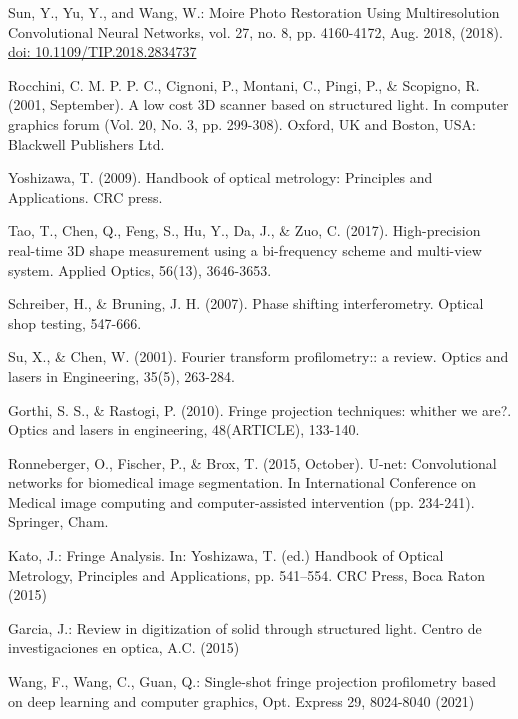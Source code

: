 \documentclass[10pt,letterpaper]{article}
\begin{document}
\begin{thebibliography}{0}
Sun, Y., Yu, Y., and Wang, W.: Moire Photo Restoration Using Multiresolution Convolutional Neural Networks, vol. 27, no. 8, pp. 4160-4172, Aug. 2018, (2018). \url{doi: 10.1109/TIP.2018.2834737}

Rocchini, C. M. P. P. C., Cignoni, P., Montani, C., Pingi, P., \& Scopigno, R. (2001, September). A low cost 3D scanner based on structured light. In computer graphics forum (Vol. 20, No. 3, pp. 299-308). Oxford, UK and Boston, USA: Blackwell Publishers Ltd.

Yoshizawa, T. (2009). Handbook of optical metrology: Principles and Applications. CRC press.

Tao, T., Chen, Q., Feng, S., Hu, Y., Da, J., \& Zuo, C. (2017). High-precision real-time 3D shape measurement using a bi-frequency scheme and multi-view system. Applied Optics, 56(13), 3646-3653.

Schreiber, H., \& Bruning, J. H. (2007). Phase shifting interferometry. Optical shop testing, 547-666.

Su, X., \& Chen, W. (2001). Fourier transform profilometry:: a review. Optics and lasers in Engineering, 35(5), 263-284.

Gorthi, S. S., \& Rastogi, P. (2010). Fringe projection techniques: whither we are?. Optics and lasers in engineering, 48(ARTICLE), 133-140.













Ronneberger, O., Fischer, P., \& Brox, T. (2015, October). U-net: Convolutional networks for biomedical image segmentation. In International Conference on Medical image computing and computer-assisted intervention (pp. 234-241). Springer, Cham.

Kato, J.: Fringe Analysis. In: Yoshizawa, T. (ed.) Handbook of Optical Metrology, Principles and Applications, pp. 541–554. CRC Press, Boca Raton (2015)

Garcia, J.: Review in digitization of solid through structured light. Centro de investigaciones en optica, A.C. (2015)

Wang, F., Wang, C., Guan, Q.: Single-shot fringe projection profilometry based on deep learning and computer graphics, Opt. Express 29, 8024-8040 (2021)


\end{thebibliography}
\end{document}
